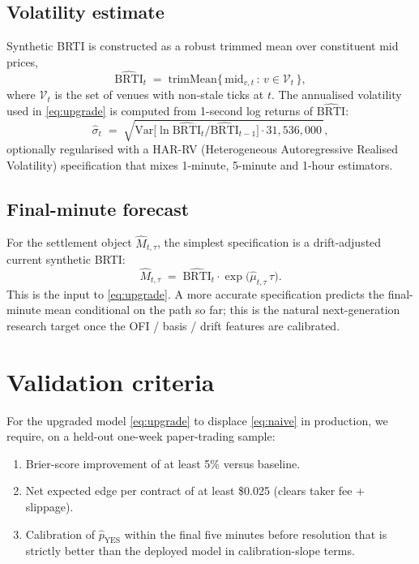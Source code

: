 \documentclass[11pt]{article}
\begin{document}
\subsection{Volatility estimate}

Synthetic BRTI is constructed as a robust trimmed mean over constituent mid prices,
\begin{equation}
\widehat{\mathrm{BRTI}}_t \;=\; \mathrm{trimMean}\big\{\,\mathrm{mid}_{v,t}\,:\, v \in \mathcal{V}_t\,\big\},
\end{equation}
where $\mathcal{V}_t$ is the set of venues with non-stale ticks at $t$. The annualised volatility used in \eqref{eq:upgrade} is computed from 1-second log returns of $\widehat{\mathrm{BRTI}}$:
\begin{equation}
\hat\sigma_t \;=\; \sqrt{\mathrm{Var}\!\big[\ln \widehat{\mathrm{BRTI}}_{t} / \widehat{\mathrm{BRTI}}_{t-1}\big] \cdot 31{,}536{,}000\,},
\end{equation}
optionally regularised with a HAR-RV (Heterogeneous Autoregressive Realised Volatility) specification that mixes 1-minute, 5-minute and 1-hour estimators.

\subsection{Final-minute forecast}

For the settlement object $\hat M_{t,\tau}$, the simplest specification is a drift-adjusted current synthetic BRTI:
\begin{equation}
\hat M_{t,\tau} \;=\; \widehat{\mathrm{BRTI}}_t \cdot \exp\!\big(\hat\mu_{t,\tau}\,\tau\big).
\end{equation}
This is the input to \eqref{eq:upgrade}. A more accurate specification predicts the final-minute mean conditional on the path so far; this is the natural next-generation research target once the OFI / basis / drift features are calibrated.

\section{Validation criteria}

For the upgraded model \eqref{eq:upgrade} to displace \eqref{eq:naive} in production, we require, on a held-out one-week paper-trading sample:
\begin{enumerate}
\item Brier-score improvement of at least 5\% versus baseline.
\item Net expected edge per contract of at least \$0.025 (clears taker fee + slippage).
\item Calibration of $\hat p_{\text{YES}}$ within the final five minutes before resolution that is strictly better than the deployed model in calibration-slope terms.
\end{enumerate}
\end{document}

